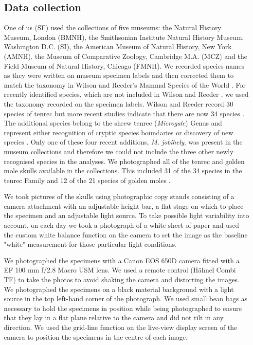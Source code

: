 \documentclass[12pt,a4paper]{article}
\begin{document}
\subsection{Data collection}
	One of us (SF) used the collections of five museums: the Natural History Museum, London (BMNH), the Smithsonian Institute Natural History Museum, Washington D.C. (SI), the American Museum of Natural History, New York (AMNH), the Museum of Comparative Zoology, Cambridge M.A. (MCZ) and the Field Museum of Natural History, Chicago (FMNH). We recorded species names as they were written on museum specimen labels and then corrected them to match the taxonomy in Wilson and Reeder's Mammal Species of the World \citeyearpar{Wilson2005}. For recently identified species,  which are not included in Wilson and Reeder \citeyearpar{Wilson2005}, we used the taxonomy recorded on the specimen labels. Wilson and Reeder \citeyearpar{Wilson2005} record 30 species of tenrec but more recent studies indicate that there are now 34 species \citep[][]{Olson2013}. The additional species belong to the shrew tenrec (\textit{Microgale}) Genus and represent either recognition of cryptic species boundaries \citep{Olson2004} or discovery of new species \citep{Goodman2006, Olson2009}. Only one of these four recent additions, \textit{M. jobihely}, was present in the museum collections and therefore we could not include the three other newly recognised species in the analyses. 
 	We photographed all of the tenrec and golden mole skulls available in the collections. This included 31 of the 34 species in the tenrec Family and 12 of the 21 species of golden moles \citep{Wilson2005}.
	
	We took pictures of the skulls using photographic copy stands consisting of a camera attachment with an adjustable height bar, a flat stage on which to place the specimen and an adjustable light source. To take possible light variability into account, on each day we took a photograph of a white sheet of paper and used the custom white balance function on the camera to set the image as the baseline "white" measurement for those particular light conditions.
		
	We photographed the specimens with a Canon EOS 650D camera fitted with a EF 100 mm f/2.8 Macro USM lens. We used a remote control (H\"ahnel Combi TF) to take the photos to avoid shaking the camera and distorting the images. We photographed the specimens on a black material background with a light source in the top left-hand corner of the photograph. We used small bean bags as necessary to hold the specimens in position while being photographed to ensure that they lay in a flat plane relative to the camera and did not tilt in any direction. We used the grid-line function on the live-view display screen of the camera to position the specimens in the centre of each image. 
	
\end{document}
